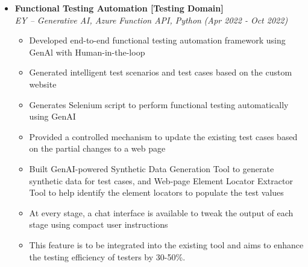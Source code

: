 \documentclass[a4paper,10pt]{article}
\newcommand{\isep}{-2 pt}
\begin{document}
\begin{itemize}
\item \textbf{Functional Testing Automation [Testing Domain]}  \\
    \emph{EY -- Generative AI, Azure Function API, Python} \hfill {\emph{(Apr 2022 - Oct 2022)}}
    \\[-0.5cm]
    \begin{itemize}\itemsep \isep
    	\item Developed end-to-end functional testing automation framework using GenAl with Human-in-the-loop
            \item Generated intelligent test scenarios and test cases based on the custom website
            \item Generates Selenium script to perform functional testing automatically using GenAI
            \item Provided a controlled mechanism to update the existing test cases based on the partial changes to a web page
            \item Built GenAI-powered Synthetic Data Generation Tool to generate synthetic data for test cases, and Web-page Element Locator Extractor Tool to help identify the element locators to populate the test values
            \item At every stage, a chat interface is available to tweak the output of each stage using compact user instructions
            \item This feature is to be integrated into the existing tool and aims to enhance the testing efficiency of testers by 30-50\%.
        \\ [-0.5cm]
    \end{itemize}
 

\end{itemize}
\end{document}
